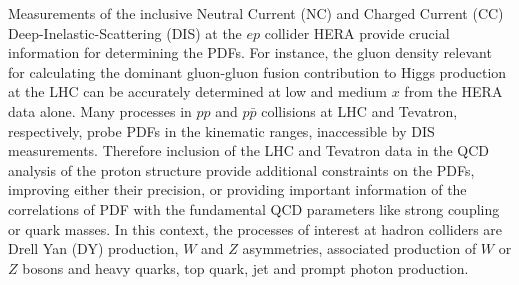 Measurements of the inclusive Neutral Current (NC) and Charged Current (CC)  
Deep-Inelastic-Scattering (DIS) at the $ep$ collider HERA provide crucial information for determining the PDFs.
%
For instance, the gluon density relevant
for calculating the dominant gluon-gluon fusion contribution to Higgs production
at the LHC can be accurately determined at low and medium $x$ from the HERA data alone.
%
Many processes in $pp$ and $p \bar p$ collisions at LHC and Tevatron, respectively, 
probe PDFs in the kinematic ranges, inaccessible by DIS measurements. 
Therefore inclusion of the LHC and Tevatron data in the QCD analysis of the proton structure 
provide additional constraints on the PDFs, improving either their precision, 
or providing important information of the correlations of PDF with the fundamental 
QCD parameters like strong coupling or quark masses. 
%
%
In this context, the processes of interest at hadron colliders are
Drell Yan (DY) production, $W$ and $Z$ asymmetries, associated production of $W$ or $Z$ bosons 
and heavy quarks, top quark, jet and prompt photon production.
%

